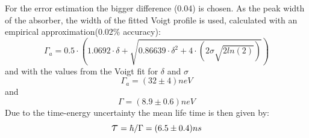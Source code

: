 For the error estimation the bigger difference (0.04) is chosen. As the peak width of the absorber, the width of the fitted Voigt profile is used, calculated with an empirical  approximation($0.02\%$ accuracy)\cite{Olivero}:
\begin{equation}
\Gamma_a=0.5\cdot (1.0692\cdot \delta+\sqrt{0.86639\cdot \delta^2 + 4\cdot (2\sigma\sqrt{2ln(2)})})
\end{equation}
and with the values from the Voigt fit for $\delta$ and $\sigma$
\begin{equation}
\Gamma_a=\unit{(32\pm4)}{neV}
\end{equation}
and
\begin{equation}
\Gamma=\unit{(8.9\pm0.6)}{neV}
\end{equation}
Due to the time-energy uncertainty the mean life time is then given by:
\begin{equation}
\scalebox{1.5}{$\tau$}=\hbar/\Gamma=\unit{(6.5\pm0.4)}{ns}
\end{equation}
